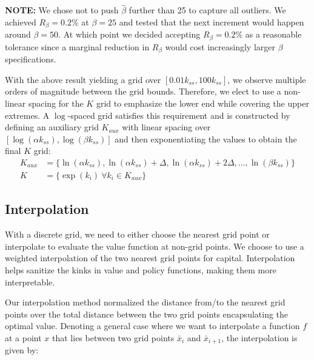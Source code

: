 \noindent\textbf{NOTE:} We chose not to push $\hat{\beta}$ further than 25 to capture all outliers. We achieved $R_\beta = 0.2\%$ at $\beta = 25$ and tested that the next increment would happen around $\beta=50$. 
At which point we decided accepting $R_\beta = 0.2\%$ as a reasonable tolerance since a marginal reduction in $R_\beta$ would cost increasingly larger $\beta$ specifications.

\vspace{\baselineskip}

With the above result yielding a grid over $[0.01 k_{ss}, 100 k_{ss}]$, we observe multiple orders of magnitude between the grid bounds.
Therefore, we elect to use a non-linear spacing for the $K$ grid to emphasize the lower end while covering the upper extremes.
A $\log$-spaced grid satisfies this requirement and is constructed by defining an auxiliary grid $K_{aux}$ with linear spacing over $[\log(\alpha k_{ss}), \log(\beta k_{ss})]$ and then exponentiating the values to obtain the final $K$ grid:
\begin{equation}
    \begin{aligned}
        K_{aux} &= \{\ln(\alpha k_{ss}), \ln(\alpha k_{ss}) + \Delta, \ln(\alpha k_{ss}) + 2\Delta, \dots, \ln(\beta k_{ss})\} \\
        K &= \{\exp(k_i)\ \forall k_i \in K_{aux}\}
    \end{aligned}
\end{equation}

\subsection{Interpolation}\label{subsec:interpolation}
With a discrete grid, we need to either choose the nearest grid point or interpolate to evaluate the value function at non-grid points.
We choose to use a weighted interpolation of the two nearest grid points for capital.
Interpolation helps sanitize the kinks in value and policy functions, making them more interpretable.

\vspace{\baselineskip}

Our interpolation method normalized the distance from/to the nearest grid points over the total distance between the two grid points encapsulating the optimal value.
Denoting a general case where we want to interpolate a function $f$ at a point $x$ that lies between two grid points $\bar{x}_i$ and $\bar{x}_{i+1}$, the interpolation is given by:

